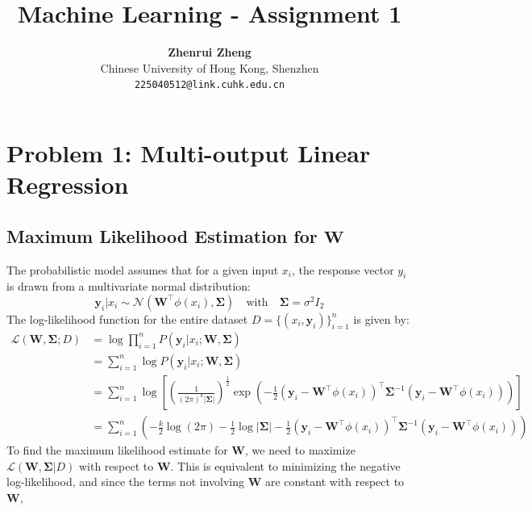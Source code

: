 \documentclass[11pt, a4paper, oneside]{memoir}
\title{\huge\textbf{Machine Learning - Assignment 1}\vspace{-0.5cm}}
\author{\textbf{Zhenrui Zheng} \vspace{0.5cm} \\ \small Chinese University of Hong Kong, Shenzhen \\ \small\texttt{225040512@link.cuhk.edu.cn}}
\date{}
\begin{document}
\begin{titlingpage}
\maketitle
\renewcommand{\contentsname}{\huge Contents \vspace{-1cm}}
\begin{KeepFromToc} %
\tableofcontents
\end{KeepFromToc}
\end{titlingpage}

\chapter{Problem 1: Multi-output Linear Regression}
\section[Maximum Likelihood Estimation for W]{Maximum Likelihood Estimation for $\mathbf{W}$}
The probabilistic model assumes that for a given input $x_i$, the response vector $y_i$ is drawn from a multivariate normal distribution:
\[ \mathbf{y}_i | x_i \sim \mathcal{N}(\mathbf{W}^\top\phi(x_i), \mathbf{\Sigma}) \quad \text{with} \quad \mathbf{\Sigma} = \sigma^2\mathit{I}_2 \]
The log-likelihood function for the entire dataset $D = \{(x_i, \mathbf{y}_i)\}_{i=1}^n$ is given by:
\begin{align*}
    \mathcal{L}(\mathbf{W}, \mathbf{\Sigma} ; D) &= \log \prod_{i=1}^n P(\mathbf{y}_i | x_i; \mathbf{W}, \mathbf{\Sigma}) \\
    &= \sum_{i=1}^n \log P(\mathbf{y}_i | x_i; \mathbf{W}, \mathbf{\Sigma}) \\
    &= \sum_{i=1}^n \log \left[ \left( \frac{1}{(2\pi)^k|\mathbf{\Sigma}|} \right)^{\frac{1}{2}} \exp\left(-\frac{1}{2}(\mathbf{y}_i - \mathbf{W}^\top\phi(x_i))^\top\mathbf{\Sigma}^{-1}(\mathbf{y}_i - \mathbf{W}^\top\phi(x_i))\right)\right] \\
    &= \sum_{i=1}^n \left( -\frac{k}{2}\log(2\pi) - \frac{1}{2}\log|\mathbf{\Sigma}| - \frac{1}{2}(\mathbf{y}_i - \mathbf{W}^\top\phi(x_i))^\top\mathbf{\Sigma}^{-1}(\mathbf{y}_i - \mathbf{W}^\top\phi(x_i)) \right)
\end{align*}
To find the maximum likelihood estimate for $\mathbf{W}$, we need to maximize $\mathcal{L}(\mathbf{W}, \mathbf{\Sigma} | D)$ with respect to $\mathbf{W}$.
This is equivalent to minimizing the negative log-likelihood, and since the terms not involving $\mathbf{W}$ are constant with respect to $\mathbf{W}$,
\end{document}
